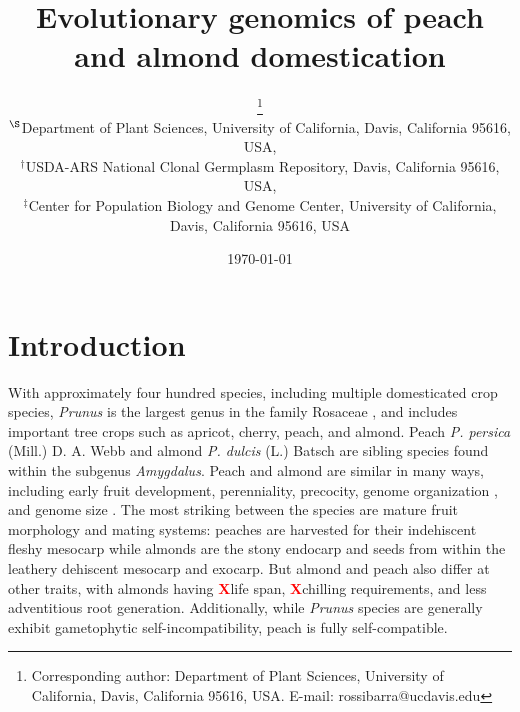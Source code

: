 \documentclass[12pt]{article}
\newcommand{\X}{\textcolor{red}{\bf X}}
\begin{document}
\title{Evolutionary genomics of peach \\and almond domestication}

\author{\small{}\thanks{Corresponding author: Department of Plant Sciences, University of California, Davis, California 95616, USA. E-mail: \mbox{rossibarra@ucdavis.edu}} \\[0.3cm]
     \small\sf $^{\S}$Department of Plant Sciences, University of California, Davis, California 95616, USA,\\
     \small\sf $^{\dag}$USDA-ARS National Clonal Germplasm Repository, Davis, California 95616, USA,\\
     \small\sf $^{\ddag}$Center for Population Biology and Genome Center, University of California, Davis, California 95616, USA}

\date{\today}
\maketitle

\section*{Introduction}
%
With approximately four hundred species, including multiple domesticated crop species, \emph{Prunus} is the largest genus in the family Rosaceae \cite{}, and includes important tree crops such as apricot, cherry, peach, and almond.
%
Peach \emph{P. persica} (Mill.) D. A. Webb and almond \emph{P. dulcis} (L.) Batsch are sibling species found within the subgenus \emph{Amygdalus}.
%
Peach and almond are similar in many ways, including early fruit development, perenniality, precocity, genome organization \citep{arus2012peach}, and genome size \citep{arumuganathan1991nuclear, dickson1992nuclear, baird1994estimating, loureiro2007two}. 
%
The most striking between the species are mature fruit morphology and mating systems: peaches are harvested for their indehiscent fleshy mesocarp while almonds are the stony endocarp and seeds from within the leathery dehiscent mesocarp and exocarp. 
%
But almond and peach also differ at other traits, with almonds having \X life span, \X  chilling requirements, and less adventitious root generation.
%
Additionally, while \emph{Prunus} species are generally exhibit gametophytic self-incompatibility, peach is fully self-compatible.
\end{document}
